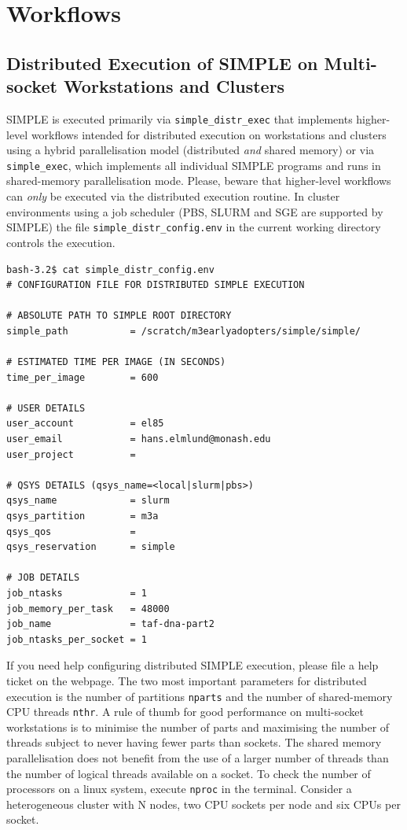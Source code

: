 \documentclass[a4paper,11pt]{article}
\begin{document}
\section{Workflows}

\subsection{Distributed Execution of SIMPLE on Multi-socket Workstations and Clusters}
SIMPLE is executed primarily via \texttt{simple\_distr\_exec} that implements higher-level workflows intended for distributed execution on workstations and clusters using a hybrid parallelisation model (distributed \textit{and} shared memory) or via \texttt{simple\_exec}, which implements all individual SIMPLE programs and runs in shared-memory parallelisation mode. Please, beware that higher-level workflows can \textit{only} be executed via the distributed execution routine.  In cluster environments using a job scheduler (PBS, SLURM and SGE are supported by SIMPLE) the file \texttt{simple\_distr\_config.env} in the current working directory controls the execution.
\begin{verbatim}
bash-3.2$ cat simple_distr_config.env 
# CONFIGURATION FILE FOR DISTRIBUTED SIMPLE EXECUTION

# ABSOLUTE PATH TO SIMPLE ROOT DIRECTORY
simple_path           = /scratch/m3earlyadopters/simple/simple/

# ESTIMATED TIME PER IMAGE (IN SECONDS)
time_per_image        = 600

# USER DETAILS
user_account          = el85 
user_email            = hans.elmlund@monash.edu
user_project          = 

# QSYS DETAILS (qsys_name=<local|slurm|pbs>)
qsys_name             = slurm
qsys_partition        = m3a
qsys_qos              =
qsys_reservation      = simple

# JOB DETAILS
job_ntasks            = 1
job_memory_per_task   = 48000
job_name              = taf-dna-part2
job_ntasks_per_socket = 1
\end{verbatim}
If you need help configuring distributed SIMPLE execution, please file a help ticket on the webpage. The two most important parameters for distributed execution is the number of partitions \texttt{nparts} and the number of shared-memory CPU threads \texttt{nthr}. A rule of thumb for good performance on multi-socket workstations is to minimise the number of parts and maximising the number of threads subject to never having fewer parts than sockets. The shared memory parallelisation does not benefit from the use of a larger number of threads than the number of logical threads available on a socket. To check the number of processors on a linux system, execute \texttt{nproc} in the terminal. Consider a heterogeneous cluster with N nodes, two CPU sockets per node and six CPUs per socket.
\end{document}
